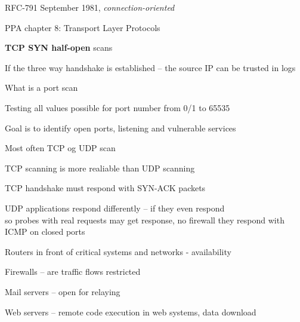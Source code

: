 \documentclass[Screen16to9,17pt]{foils}
\begin{document}
\begin{list1}
\item RFC-791 September 1981, \emph{connection-oriented}
\end{list1}



\begin{list2}
\item PPA chapter 8: Transport Layer Protocols
\item {\bfseries TCP SYN half-open} scans
\item If the three way handshake is established -- the source IP can be trusted in logs
\end{list2}



\begin{list1}
\item What is a port scan
\item Testing all values possible for port number from 0/1 to 65535
\item Goal is to identify open ports, listening and vulnerable services
\item Most often TCP og UDP scan
\item TCP scanning is more realiable than UDP scanning
\item TCP handshake must respond with SYN-ACK packets
\item UDP applications respond differently -- if they even respond\\
so probes with real requests may get response, no firewall they respond with ICMP on closed ports
\end{list1}





\begin{list2}
\item Routers in front of critical systems and networks - availability
\item Firewalls -- are traffic flows restricted
\item Mail servers -- open for relaying
\item Web servers -- remote code execution in web systems, data download
\end{list2}
\end{document}
